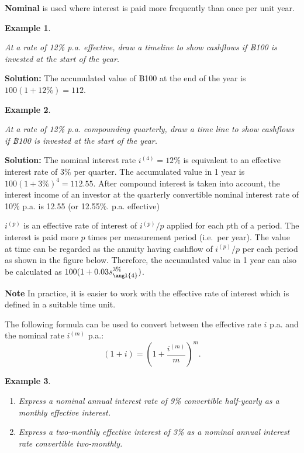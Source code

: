 \documentclass[
]{book}
\theoremstyle{definition}
\theoremstyle{definition}
\newtheorem{example}{Example}[chapter]
\theoremstyle{definition}
\theoremstyle{definition}
\theoremstyle{remark}
\begin{document}
\textbf{Nominal} is used where interest is paid more frequently than once per
unit year.

\begin{example}
\protect\hypertarget{exm:unlabeled-div-39}{}\label{exm:unlabeled-div-39}

\emph{At a rate of 12\% p.a. effective, draw a timeline to show cashflows if
฿100 is invested at the start of the year.}

\end{example}

\textbf{Solution:} The accumulated value of ฿100 at the end of the year is
\(100 (1 + 12\%) = 112\).

\begin{example}
\protect\hypertarget{exm:unlabeled-div-40}{}\label{exm:unlabeled-div-40}

\emph{At a rate of 12\% p.a. compounding quarterly, draw a time line to show
cashflows if ฿100 is invested at the start of the year.}

\end{example}

\textbf{Solution:} The nominal interest rate \(i^{(4)} = 12\%\) is equivalent
to an effective interest rate of \(3\%\) per quarter. The accumulated
value in 1 year is \(100 (1 + 3\%)^4 = 112.55\). After compound interest
is taken into account, the interest income of an investor at the
quarterly convertible nominal interest rate of 10\% p.a. is 12.55 (or
12.55\%. p.a. effective)

\(i^{(p)}\) is an effective rate of interest of \(i^{(p)}/p\) applied for
each \(p\)th of a period. The interest is paid more \(p\) times per
measurement period (i.e.~per year). The value at time can be regarded as
the annuity having cashflow of \(i^{(p)}/p\) per each period as shown in
the figure below. Therefore, the accumulated value in 1 year can also be
calculated as \(100( 1 + 0.03 s_{\angl{4}}^{3\%})\).

\textbf{Note} In practice, it is easier to work with the effective rate of
interest which is defined in a suitable time unit.

The following formula can be used to convert between the effective rate
\(i\) p.a. and the nominal rate \(i^{(m)}\) p.a.:
\[( 1 + i) = \left( 1 + \frac{i^{(m)}}{m}\right)^m.\]

\begin{example}
\protect\hypertarget{exm:unlabeled-div-41}{}\label{exm:unlabeled-div-41}

\begin{enumerate}
\def\labelenumi{\arabic{enumi}.}
\item
  \emph{Express a nominal annual interest rate of 9\% convertible
  half-yearly as a monthly effective interest.}
\item
  \emph{Express a two-monthly effective interest of 3\% as a nominal annual
  interest rate convertible two-monthly.}
\end{enumerate}

\end{example}
\end{document}
